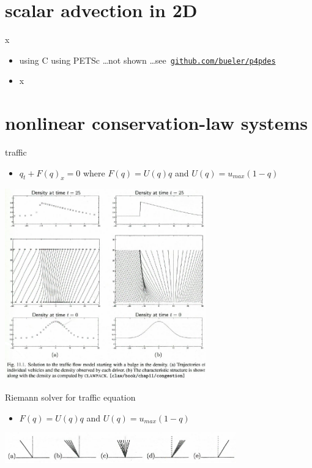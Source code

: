 \documentclass[10pt,hyperref]{beamer}
\begin{document}
\section{scalar advection in 2D}

\begin{frame}{x}

\begin{itemize}
\item using C using PETSc \dots not shown \dots see \,\href{https://github.com/bueler/p4pdes}{\texttt{github.com/bueler/p4pdes}}
\item x
\end{itemize}
\end{frame}


\section{nonlinear conservation-law systems}

\begin{frame}{traffic}

\begin{itemize}
\item $q_t + F(q)_x = 0$ where $F(q) = U(q) q$ and $U(q) = u_{max} (1-q)$
\end{itemize}

\hfill \includegraphics[width=0.65\textwidth]{figs/leveque11p1}
\end{frame}

\begin{frame}{Riemann solver for traffic equation}

\begin{itemize}
\item $F(q) = U(q) q$ and $U(q) = u_{max} (1-q)$
\end{itemize}

\hfill \includegraphics[width=0.75\textwidth]{figs/leveque12p1}
\end{frame}
\end{document}
